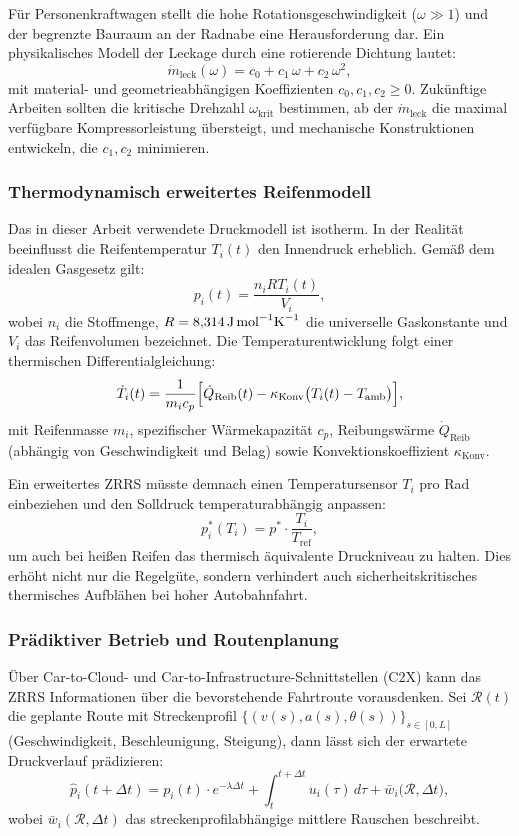 ﻿\documentclass[a4paper,12pt]{article}
\theoremstyle{definition}
\begin{document}
Für Personenkraftwagen stellt die hohe Rotationsgeschwindigkeit ($\omega \gg 1$)
und der begrenzte Bauraum an der Radnabe eine Herausforderung dar. Ein
physikalisches Modell der Leckage durch eine rotierende Dichtung lautet:
\[
    \dot{m}_{\text{leck}}(\omega) = c_0 + c_1\,\omega + c_2\,\omega^2,
\]
mit material- und geometrieabhängigen Koeffizienten $c_0, c_1, c_2 \geq 0$.
Zukünftige Arbeiten sollten die kritische Drehzahl $\omega_{\text{krit}}$
bestimmen, ab der $\dot{m}_{\text{leck}}$ die maximal verfügbare
Kompressorleistung übersteigt, und mechanische Konstruktionen entwickeln,
die $c_1, c_2$ minimieren.

\subsubsection{Thermodynamisch erweitertes Reifenmodell}

Das in dieser Arbeit verwendete Druckmodell ist isotherm. In der Realität
beeinflusst die Reifentemperatur $T_i(t)$ den Innendruck erheblich. Gemäß
dem idealen Gasgesetz gilt:
\[
    p_i(t) = \frac{n_i R T_i(t)}{V_i},
\]
wobei $n_i$ die Stoffmenge, $R = 8{,}314\,\text{J\,mol}^{-1}\text{K}^{-1}$
die universelle Gaskonstante und $V_i$ das Reifenvolumen bezeichnet.
Die Temperaturentwicklung folgt einer thermischen Differentialgleichung:
\[
    \dot{T}_i(t) = \frac{1}{m_i c_p}\Bigl[\dot{Q}_{\text{Reib}}(t)
    - \kappa_{\text{Konv}}\bigl(T_i(t) - T_{\text{amb}}\bigr)\Bigr],
\]
mit Reifenmasse $m_i$, spezifischer Wärmekapazität $c_p$, Reibungswärme
$\dot{Q}_{\text{Reib}}$ (abhängig von Geschwindigkeit und Belag) sowie
Konvektionskoeffizient $\kappa_{\text{Konv}}$.

Ein erweitertes ZRRS müsste demnach einen Temperatursensor $T_i$ pro Rad
einbeziehen und den Solldruck temperaturabhängig anpassen:
\[
    p^*_i(T_i) = p^* \cdot \frac{T_i}{T_{\text{ref}}},
\]
um auch bei heißen Reifen das thermisch äquivalente Druckniveau zu halten.
Dies erhöht nicht nur die Regelgüte, sondern verhindert auch sicherheitskritisches
thermisches Aufblähen bei hoher Autobahnfahrt.

\subsubsection{Prädiktiver Betrieb und Routenplanung}

Über Car-to-Cloud- und Car-to-Infrastructure-Schnittstellen (C2X) kann das
ZRRS Informationen über die bevorstehende Fahrtroute vorausdenken. Sei
$\mathcal{R}(t)$ die geplante Route mit Streckenprofil
$\{(v(s), a(s), \theta(s))\}_{s \in [0, L]}$ (Geschwindigkeit, Beschleunigung,
Steigung), dann lässt sich der erwartete Druckverlauf prädizieren:
\[
    \hat{p}_i(t + \Delta t) = p_i(t) \cdot e^{-\lambda \Delta t}
    + \int_t^{t+\Delta t} u_i(\tau)\, d\tau
    + \bar{w}_i\bigl(\mathcal{R}, \Delta t\bigr),
\]
wobei $\bar{w}_i(\mathcal{R}, \Delta t)$ das streckenprofil\-abhängige
mittlere Rauschen beschreibt.
\end{document}
